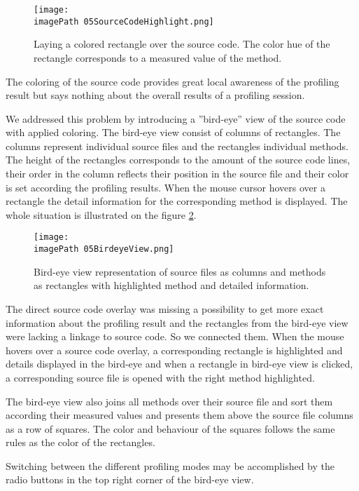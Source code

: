 \begin{figure}
	\centering
		\texttt{[image: \\imagePath 05SourceCodeHighlight.png]}
		\caption{Laying a colored rectangle over the source code. The color hue of the rectangle corresponds to a measured value of the method. }
	\label{fig:05SourceCodeHighlight}
\end{figure}

The coloring of the source code provides great local awareness of the profiling result but says nothing about the overall results of a profiling session. 

We addressed this problem by introducing a ''bird-eye'' view of the source code with applied coloring. The bird-eye view consist of columns of rectangles. The columns represent individual source files and the rectangles individual methods. The height of the rectangles corresponds to the amount of the source code lines, their order in the column reflects their position in the source file and their color is set according the profiling results.
When the mouse cursor hovers over a rectangle the detail information for the corresponding method is displayed. The whole situation is illustrated on the figure \ref{fig:05BirdeyeView}.

\begin{figure}
	\centering
		\texttt{[image: \\imagePath 05BirdeyeView.png]}
		\caption{Bird-eye view representation of source files as columns and methods as rectangles with highlighted method and detailed information. }
	\label{fig:05BirdeyeView}
\end{figure}

The direct source code overlay was missing a possibility to get more exact information about the profiling result and the rectangles from the bird-eye view were lacking a linkage to source code. So we connected them. When the mouse hovers over a source code overlay, a corresponding rectangle is highlighted and details displayed in the bird-eye and when a rectangle in bird-eye view is clicked, a corresponding source file is opened  with the right method highlighted. 

The bird-eye view also joins all methods over their source file and sort them according their measured values and presents them above the source file columns as a row of squares. The color and behaviour of the squares follows the same rules as the color of the rectangles.

Switching between the different profiling modes may be accomplished by the radio buttons in the top right corner of the bird-eye view.

